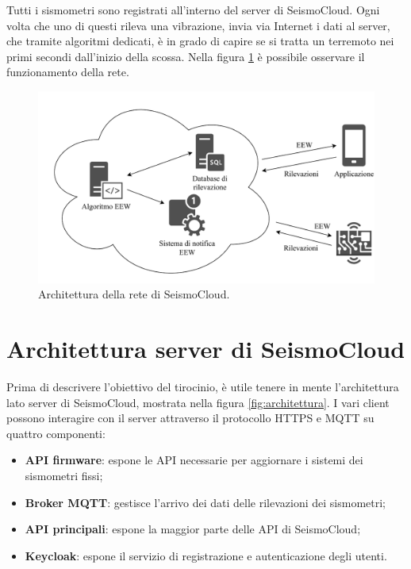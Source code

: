 Tutti i sismometri sono registrati all'interno del server di SeismoCloud. Ogni volta che uno di questi rileva una vibrazione, invia via Internet i dati al server, che tramite algoritmi dedicati, è in grado di capire se si tratta un terremoto nei primi secondi dall'inizio della scossa. Nella figura \ref{fig:rete} è possibile osservare il funzionamento della rete.

\begin{figure}[ht!]
\centering
\includegraphics[width=\textwidth]{assets/01/rete.pdf}
\caption{Architettura della rete di SeismoCloud.}
\label{fig:rete}
\end{figure}

\section{Architettura server di SeismoCloud}

Prima di descrivere l'obiettivo del tirocinio, è utile tenere in mente l'architettura lato server di SeismoCloud, mostrata nella figura \ref{fig:architettura}. I vari client possono interagire con il server attraverso il protocollo HTTPS e MQTT su quattro componenti:

\begin{itemize}
\item \textbf{API firmware}: espone le API necessarie per aggiornare i sistemi dei sismometri fissi;
\item \textbf{Broker MQTT}: gestisce l'arrivo dei dati delle rilevazioni dei sismometri;
\item \textbf{API principali}: espone la maggior parte delle API di SeismoCloud;
\item \textbf{Keycloak}: espone il servizio di registrazione e autenticazione degli utenti.
\end{itemize}

